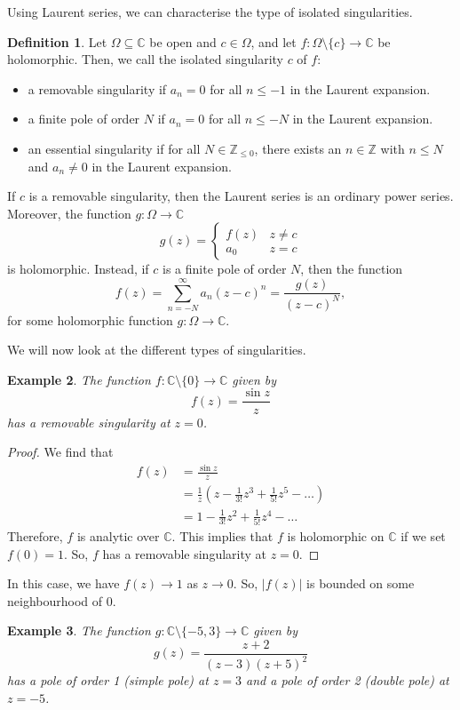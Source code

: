 \documentclass[a4paper, openany]{memoir}
\theoremstyle{definition}
\newtheorem{definition}{Definition}[section]
\theoremstyle{plain}
\newtheorem{example}[definition]{Example}
\begin{document}
Using Laurent series, we can characterise the type of isolated singularities.
\begin{definition}
Let $\Omega \subseteq \mathbb{C}$ be open and $c \in \Omega$, and let $f: \Omega \setminus \{c\} \to \mathbb{C}$ be holomorphic. Then, we call the isolated singularity $c$ of $f$:
\begin{itemize}
    \item a removable singularity if $a_n = 0$ for all $n \leq -1$ in the Laurent expansion.
    \item a finite pole of order $N$ if $a_n = 0$ for all $n \leq -N$ in the Laurent expansion.
    \item an essential singularity if for all $N \in \mathbb{Z}_{\leq 0}$, there exists an $n \in \mathbb{Z}$ with $n \leq N$ and $a_n \neq 0$ in the Laurent expansion.
\end{itemize}
\end{definition}
\noindent If $c$ is a removable singularity, then the Laurent series is an ordinary power series. Moreover, the function $g: \Omega \to \mathbb{C}$
\[g(z) = \begin{cases}
f(z) & z \neq c \\
a_0 & z = c
\end{cases}\]
is holomorphic. Instead, if $c$ is a finite pole of order $N$, then the function
\[f(z) = \sum_{n=-N}^\infty a_n (z - c)^n = \frac{g(z)}{(z - c)^N},\]
for some holomorphic function $g: \Omega \to \mathbb{C}$.

We will now look at the different types of singularities.
\begin{example}
The function $f: \mathbb{C} \setminus \{0\} \to \mathbb{C}$ given by
\[f(z) = \frac{\sin z}{z}\]
has a removable singularity at $z = 0$.
\end{example}
\begin{proof}
We find that
\begin{align*}
    f(z) &= \frac{\sin z}{z} \\
    &= \frac{1}{z} \left(z - \frac{1}{3!}z^3 + \frac{1}{5!} z^5 - \dots\right) \\
    &= 1 - \frac{1}{3!} z^2 + \frac{1}{5!} z^4 - \dots
\end{align*}
Therefore, $f$ is analytic over $\mathbb{C}$. This implies that $f$ is holomorphic on $\mathbb{C}$ if we set $f(0) = 1$. So, $f$ has a removable singularity at $z = 0$.
\end{proof}
\noindent In this case, we have $f(z) \to 1$ as $z \to 0$. So, $|f(z)|$ is bounded on some neighbourhood of $0$.
\begin{example}
The function $g: \mathbb{C} \setminus \{-5, 3\} \to \mathbb{C}$ given by
\[g(z) = \frac{z + 2}{(z - 3)(z + 5)^2}\]
has a pole of order 1 (simple pole) at $z = 3$ and a pole of order 2 (double pole) at $z = -5$.
\end{example}
\end{document}

